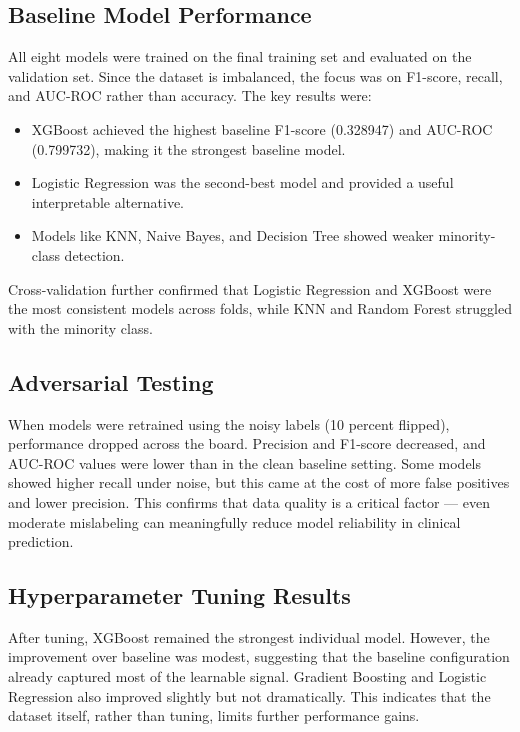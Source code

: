 \documentclass[11pt]{article}
\begin{document}
\subsection{Baseline Model Performance} All eight models were trained on the final training set and evaluated on the validation set. Since the dataset is imbalanced, the focus was on F1-score, recall, and AUC-ROC rather than accuracy. The key results were:
\begin{itemize}
    \item \textbf{} XGBoost achieved the highest baseline F1-score (0.328947) and AUC-ROC (0.799732), making it the strongest baseline model.

    \item \textbf{} Logistic Regression was the second-best model and provided a useful interpretable alternative.

    \item \textbf{} Models like KNN, Naive Bayes, and Decision Tree showed weaker minority-class detection.


    \end{itemize}
Cross-validation further confirmed that Logistic Regression and XGBoost were the most consistent models across folds, while KNN and Random Forest struggled with the minority class.

\subsection{Adversarial Testing
} When models were retrained using the noisy labels (10 percent flipped), performance dropped across the board. Precision and F1-score decreased, and AUC-ROC values were lower than in the clean baseline setting. Some models showed higher recall under noise, but this came at the cost of more false positives and lower precision. This confirms that data quality is a critical factor — even moderate mislabeling can meaningfully reduce model reliability in clinical prediction.
\subsection{Hyperparameter Tuning Results
} After tuning, XGBoost remained the strongest individual model. However, the improvement over baseline was modest, suggesting that the baseline configuration already captured most of the learnable signal. Gradient Boosting and Logistic Regression also improved slightly but not dramatically. This indicates that the dataset itself, rather than tuning, limits further performance gains.
\end{document}
